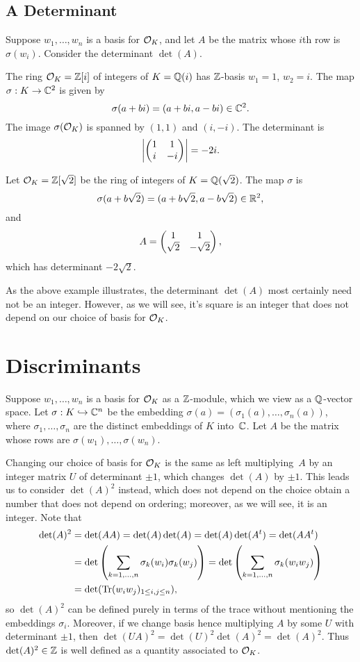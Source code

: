 \subsection{A Determinant}
 Suppose $w_1,\ldots, w_n$ is a basis for
$\mathcal{O}_K$, and let $A$ be the matrix whose $i$th row is $\sigma(w_i)$.
Consider the determinant $\det(A)$.
\begin{example}
The ring $\mathcal{O}_K=\mathbb{Z}[i]$ of integers of $K=\mathbb{Q}(i)$
has $\mathbb{Z}$-basis $w_1=1$, $w_2=i$.
The map $\sigma:K\to \mathbb{C}^2$ is given by 
$$
   \sigma(a+bi) = (a+bi,a-bi)\in\mathbb{C}^2.
$$
The image $\sigma(\mathcal{O}_K)$ is spanned by
$(1,1)$ and $(i,-i)$.  
The determinant is
\[
  \left|\left( \begin{matrix}1&1\\i&-i \end{matrix}\right)\right| = -2i.
\]

Let $\mathcal{O}_K=\mathbb{Z}[\sqrt{2}]$ be the ring of integers of $K=\mathbb{Q}(\sqrt{2})$.
The map $\sigma$ is
\[
  \sigma(a+b\sqrt{2}) = (a+b\sqrt{2},a-b\sqrt{2})\in\mathbb{R}^2,
\]
and 
\[
A = \left( \begin{matrix}1&1\\\sqrt{2}&-\sqrt{2} \end{matrix}\right),
\]
which has determinant
$ -2\sqrt{2}$.
\end{example}
As the above example illustrates, the determinant $\det(A)$ most
certainly need not be an integer.  However, as we will see, it's
square is an integer that does not depend on our choice of 
basis for $\mathcal{O}_K$.

\section{Discriminants}\label{sec:disc}
Suppose $w_1,\ldots, w_n$ is a basis for $\mathcal{O}_K$ as a $\mathbb{Z}$-module,
which we view as a $\mathbb{Q}$-vector space.  Let $ \sigma : K\hookrightarrow \mathbb{C}^n $ be
the embedding $\sigma(a)=(\sigma_1(a),\ldots,\sigma_n(a))$, where
$\sigma_1,\ldots, \sigma_n$ are the distinct embeddings of $K$
into~$\mathbb{C}$.  Let $A$ be the matrix whose rows are $\sigma(w_1), \ldots,
\sigma(w_n)$.   

Changing our choice of
basis for $\mathcal{O}_K$ is the same as left multiplying~$A$ by an integer
matrix $U$ of determinant $\pm 1$, which changes
$\det(A)$ by $\pm 1$.  
This leads us to consider $\det(A)^2$ instead, which does not depend
on the choice obtain a number that does
not depend on ordering; moreover, as we will see, it is an integer. 
Note that
\begin{align*}
\det(A)^2 &= \det(AA) = 
\det(A)\det(A)=\det(A)\det(A^t)=
\det(A A^t) \\
 &= \det\left(\sum_{k=1,\ldots,n} \sigma_k(w_i)\sigma_k(w_j)\right)
 = \det\left(\sum_{k=1,\ldots,n} \sigma_k(w_i w_j)\right)\\
 &= \det(\operatorname{Tr}(w_i w_j)_{1\leq i,j\leq n}),
\end{align*}
so $\det(A)^2$ can be defined purely in terms of the trace without
mentioning the embeddings $\sigma_i$.  
Moreover, if we change basis hence multiplying $A$ by some $U$ with determinant $\pm 1$, then
$\det(UA)^2 = \det(U)^2\det(A)^2 = \det(A)^2$.
Thus $\det(A)^2\in \mathbb{Z}$ is well defined as a quantity associated to $\mathcal{O}_K$.


